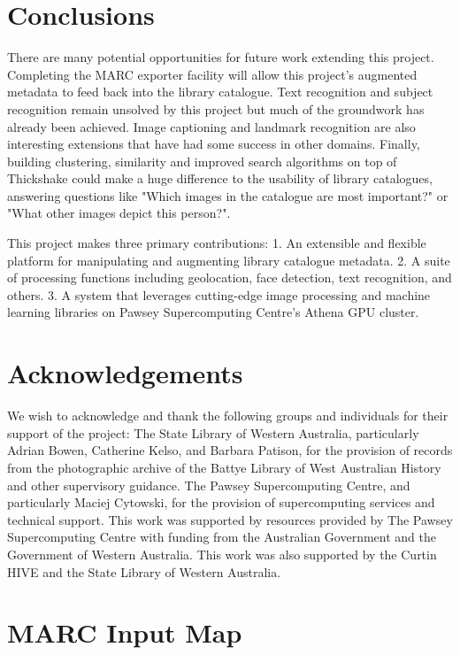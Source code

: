 \documentclass[10pt, a4paper]{article}
\begin{document}
\section{Conclusions}
\label{section:conclusions}
There are many potential opportunities for future work extending this project. Completing the MARC exporter facility will allow this project's augmented metadata to feed back into the library catalogue. Text recognition and subject recognition remain unsolved by this project but much of the groundwork has already been achieved. Image captioning \cite{karpathy2015} and landmark recognition \cite{ardeshir2015} are also interesting extensions that have had some success in other domains. Finally, building clustering, similarity and improved search algorithms on top of Thickshake could make a huge difference to the usability of library catalogues, answering questions like "Which images in the catalogue are most important?" or "What other images depict this person?".

This project makes three primary contributions: 1. An extensible and flexible platform for manipulating and augmenting library catalogue metadata. 2. A suite of processing functions including geolocation, face detection, text recognition, and others. 3. A system that leverages cutting-edge image processing and machine learning libraries on Pawsey Supercomputing Centre’s Athena GPU cluster. 

\section{Acknowledgements}
\label{section:acknowledgements}
We wish to acknowledge and thank the following groups and individuals for their support of the project: The State Library of Western Australia, particularly Adrian Bowen, Catherine Kelso, and Barbara Patison, for the provision of records from the photographic archive of the Battye Library of West Australian History and other supervisory guidance. The Pawsey Supercomputing Centre, and particularly Maciej Cytowski, for the provision of supercomputing services and technical support. This work was supported by resources provided by The Pawsey Supercomputing Centre with funding from the Australian Government and the Government of Western Australia. This work was also supported by the Curtin HIVE and the State Library of Western Australia.

\printbibliography

\pagebreak\clearpage\appendix

\section{MARC Input Map}
\label{appendix:marc_input_map}
\inputminted{yaml}{appendices/input.yaml}
\end{document}
